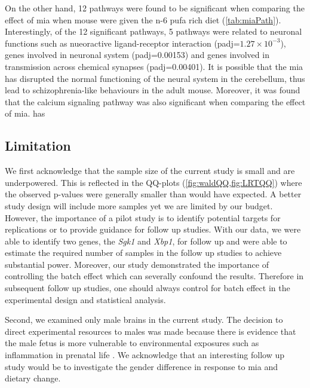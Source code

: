 On the other hand, 12 pathways were found to be significant when comparing the effect of \gls{mia} when mouse were given the n-6 \gls{pufa} rich diet (\cref{tab:miaPath}).
Interestingly, of the 12 significant pathways, 5 pathways were related to neuronal functions such as nueoractive ligand-receptor interaction (padj=$1.27\times 10^{-3}$), genes involved in neuronal system (padj=0.00153) and genes involved in transmission across chemical synapses (padj=0.00401).
It is possible that the \gls{mia} has disrupted the normal functioning of the neural system in the cerebellum, thus lead to schizophrenia-like behaviours in the adult mouse. 
Moreover, it was found that the calcium signaling pathway was also significant when comparing the effect of \gls{mia}. 
\citet{Purcell2014} has 

\subsection{Limitation}
We first acknowledge that the sample size of the current study is small and are underpowered.
This is reflected in the QQ-plots (\cref{fig:waldQQ,fig:LRTQQ}) where the observed p-values were generally smaller than would have expected.
A better study design will include more samples yet we are limited by our budget.
However, the importance of a pilot study is to identify potential targets for replications or to provide guidance for follow up studies. 
With our data, we were able to identify two genes, the \textit{Sgk1} and \textit{Xbp1}, for follow up and were able to estimate the required number of samples in the follow up studies to achieve substantial power.
Moreover, our study demonstrated the importance of controlling the batch effect which can severally confound the results.
Therefore in subsequent follow up studies, one should always control for batch effect in the experimental design and statistical analysis.

Second, we examined only male brains in the current study. 
The decision to direct experimental resources to males was made because there is evidence that the male fetus is more vulnerable to environmental exposures such as inflammation in prenatal life \citep{Bergeron2013,Lein2007}. 
We acknowledge that an interesting follow up study would be to investigate the gender difference in response to \gls{mia} and dietary change.

